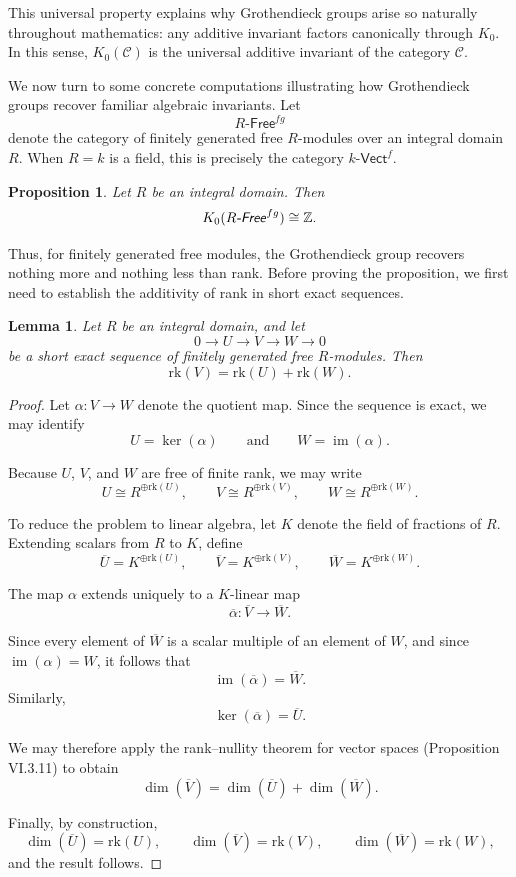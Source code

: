 \documentclass[12pt,reqno]{amsart}
\theoremstyle{plain}
\newtheorem{prop}[thm]{Proposition}
\numberwithin{equation}{section}
\newtheorem{lemma}{Lemma}
\begin{document}
This universal property explains why Grothendieck groups arise so naturally throughout mathematics: any additive invariant factors canonically through $K_0$. In this sense, $K_0(\mathcal C)$ is the universal additive invariant of the category $\mathcal C$.

We now turn to some concrete computations illustrating how Grothendieck groups recover familiar algebraic invariants. Let
\[
R\textsf{-Free}^{fg}
\]
denote the category of finitely generated free $R$-modules over an integral domain $R$. When $R=k$ is a field, this is precisely the category $k\textsf{-Vect}^f$.




\begin{prop}\label{prop: K0 of R-Free}
Let $R$ be an integral domain. Then
\[
K_0(R\textsf{\emph{-Free}}^{fg})\cong \mathbb Z.
\]
\end{prop}

Thus, for finitely generated free modules, the Grothendieck group recovers nothing more and nothing less than rank. Before proving the proposition, we first need to establish the additivity of rank in short exact sequences.

\begin{lemma}\label{lem: additivity of rank for free}
Let $R$ be an integral domain, and let
\[
0\longrightarrow U\longrightarrow V\longrightarrow W\longrightarrow 0
\]
be a short exact sequence of finitely generated free $R$-modules. Then
\[
\mathrm{rk}(V)=\mathrm{rk}(U)+\mathrm{rk}(W).
\]
\end{lemma}


\begin{proof}
Let $\alpha:V\to W$ denote the quotient map. Since the sequence is exact, we may identify
\[
U=\ker(\alpha)
\qquad\text{and}\qquad
W=\operatorname{im}(\alpha).
\]

Because $U$, $V$, and $W$ are free of finite rank, we may write
\[
U\cong R^{\oplus \mathrm{rk}(U)}, \qquad
V\cong R^{\oplus \mathrm{rk}(V)}, \qquad
W\cong R^{\oplus \mathrm{rk}(W)}.
\]

To reduce the problem to linear algebra, let $K$ denote the field of fractions of $R$. Extending scalars from $R$ to $K$, define
\[
\overline U=K^{\oplus \mathrm{rk}(U)}, \qquad
\overline V=K^{\oplus \mathrm{rk}(V)}, \qquad
\overline W=K^{\oplus \mathrm{rk}(W)}.
\]

The map $\alpha$ extends uniquely to a $K$-linear map
\[
\overline\alpha:\overline V\to \overline W.
\]

Since every element of $\overline W$ is a scalar multiple of an element of $W$, and since $\operatorname{im}(\alpha)=W$, it follows that
\[
\operatorname{im}(\overline\alpha)=\overline W.
\]
Similarly,
\[
\ker(\overline\alpha)=\overline U.
\]

We may therefore apply the rank--nullity theorem for vector spaces (Proposition VI.3.11) to obtain
\[
\dim(\overline V)
=
\dim(\overline U)
+
\dim(\overline W).
\]

Finally, by construction,
\[
\dim(\overline U)=\mathrm{rk}(U),
\qquad
\dim(\overline V)=\mathrm{rk}(V),
\qquad
\dim(\overline W)=\mathrm{rk}(W),
\]
and the result follows.
\end{proof}
\end{document}
